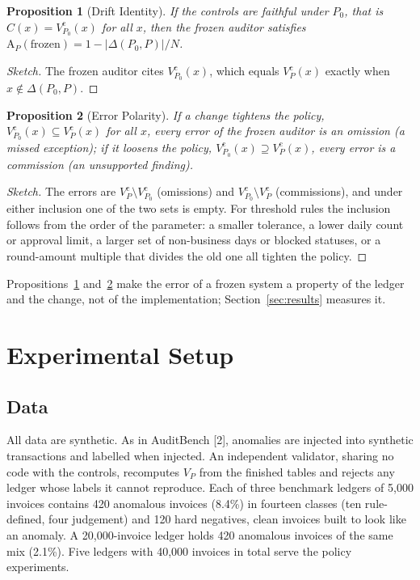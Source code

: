 \documentclass[9pt,a4paper,twocolumn]{extarticle}
\newtheorem{proposition}{Proposition}
\newcommand{\Vc}{V^{\mathrm{c}}}
\begin{document}
\begin{proposition}[Drift Identity]\label{prop:drift}
If the controls are faithful under $P_0$, that is $C(x)=\Vc_{P_0}(x)$ for all $x$, then the frozen auditor satisfies $\mathrm{A}_P(\mathrm{frozen})=1-\lvert\Delta(P_0,P)\rvert/N$.
\end{proposition}
\begin{proof}[Sketch]
The frozen auditor cites $\Vc_{P_0}(x)$, which equals $\Vc_P(x)$ exactly when $x\notin\Delta(P_0,P)$. \qedhere
\end{proof}

\begin{proposition}[Error Polarity]\label{prop:polarity}
If a change tightens the policy, $\Vc_{P_0}(x)\subseteq\Vc_P(x)$ for all $x$, every error of the frozen auditor is an omission (a missed exception); if it loosens the policy, $\Vc_{P_0}(x)\supseteq\Vc_P(x)$, every error is a commission (an unsupported finding).
\end{proposition}
\begin{proof}[Sketch]
The errors are $\Vc_P\setminus\Vc_{P_0}$ (omissions) and $\Vc_{P_0}\setminus\Vc_P$ (commissions), and under either inclusion one of the two sets is empty. For threshold rules the inclusion follows from the order of the parameter: a smaller tolerance, a lower daily count or approval limit, a larger set of non-business days or blocked statuses, or a round-amount multiple that divides the old one all tighten the policy. \qedhere
\end{proof}

Propositions~\ref{prop:drift} and~\ref{prop:polarity} make the error of a frozen system a property of the ledger and the change, not of the implementation; Section~\ref{sec:results} measures it.

\section{Experimental Setup}
\subsection{Data}
All data are synthetic. As in AuditBench [2], anomalies are injected into synthetic transactions and labelled when injected. An independent validator, sharing no code with the controls, recomputes $V_P$ from the finished tables and rejects any ledger whose labels it cannot reproduce. Each of three benchmark ledgers of 5{,}000 invoices contains 420 anomalous invoices (8.4\%) in fourteen classes (ten rule-defined, four judgement) and 120 hard negatives, clean invoices built to look like an anomaly. A 20{,}000-invoice ledger holds 420 anomalous invoices of the same mix (2.1\%). Five ledgers with 40{,}000 invoices in total serve the policy experiments.
\end{document}

